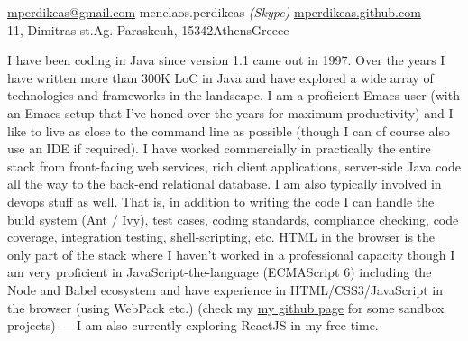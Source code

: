 \documentclass[10pt,a4paper]{article} %
\begin{document}
 



\noindent\href{mailto:mperdikeas@gmail.com}{mperdikeas@gmail.com}\bull %
menelaos.perdikeas \textit{(Skype)}\bull %
\href{http://mperdikeas.github.com}{mperdikeas.github.com}\\ %
11, Dimitras st.\bull Ag. Paraskeuh, 15342\bull Athens\bull Greece %

\spacedhrule{0.9em}{-0.4em} %



\vspace{-1.3em} %

\begin{multicols}{2}  %
  \noindent
  I have been coding in Java since version 1.1 came out in 1997. Over the years I have written more than 300K
  LoC in Java and have explored a wide array of technologies and frameworks in the landscape. 
  I am a proficient Emacs user (with an Emacs setup that I've honed over the years for maximum productivity)
  and I like to live as close to the command line as possible
  (though I can of course also use an IDE
  if required). I have worked commercially in practically the entire
  stack from front-facing web services, rich client applications, server-side Java code all the way to the back-end relational
  database. I am also typically involved in devops stuff as well. That is, in addition to writing the code I can
  handle the build system (Ant / Ivy), test cases, coding standards, compliance checking, code coverage,
  integration testing, shell-scripting, etc.
  HTML in the browser is the only part of the stack where I haven't worked in a professional capacity
  though I am very proficient in JavaScript-the-language (ECMAScript 6) including
  the Node and Babel ecosystem and have
  experience in HTML/CSS3/JavaScript in the browser (using WebPack etc.) 
  (check my \href{http://mperdikeas.github.com}{my github page} for some sandbox projects) --- I am also currently exploring ReactJS in my free time.

\end{multicols}
\end{document}

